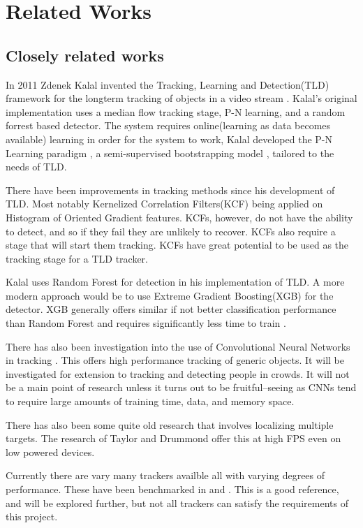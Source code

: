 \section{Related Works}
\subsection{Closely related works}
In 2011 Zdenek Kalal invented the Tracking, Learning and Detection(TLD) framework for the longterm tracking of objects in a video stream \cite{Kalal2011} \cite{KalalPHD}.
Kalal's original implementation uses a median flow tracking stage, P-N learning, and a random forrest based detector.
The system requires online(learning as data becomes available) learning in order for the system to work, Kalal developed the P-N Learning paradigm \cite{PNLearning}, a semi-supervised bootstrapping model \cite{murphy2012machine}, tailored to the needs of TLD.

There have been improvements in tracking methods since his development of TLD.
Most notably Kernelized Correlation Filters(KCF) being applied on Histogram of Oriented Gradient features\cite{Enriques2014}.
KCFs, however, do not have the ability to detect, and so if they fail they are unlikely to recover.
KCFs also require a stage that will start them tracking.
KCFs have great potential to be used as the tracking stage for a TLD tracker.

Kalal uses Random Forest for detection in his implementation of TLD.
A more modern approach would be to use Extreme Gradient Boosting(XGB) for the detector.
XGB generally offers similar if not better classification performance than Random Forest and requires significantly less time to train \cite{comparativeXGB}.

There has also been investigation into the use of Convolutional Neural Networks in tracking \cite{CNNTracking}.
This offers high performance tracking of generic objects.
It will be investigated for extension to tracking and detecting people in crowds.
It will not be a main point of research unless it turns out to be fruitful--seeing as CNNs tend to require large amounts of training time, data, and memory space.

There has also been some quite old research that involves localizing multiple targets.
The research of Taylor and Drummond \cite{taylorDrummondTracking} offer this at high FPS even on low powered devices.

Currently there are vary many trackers availble all with varying degrees of performance.
These have been benchmarked in \cite{VOT2017} and \cite{VOT2020}.
This is a good reference, and will be explored further, but not all trackers can satisfy the requirements of this project. 

